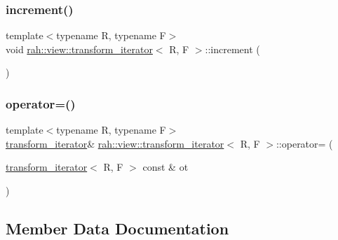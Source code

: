 \subsubsection{\texorpdfstring{increment()}{increment()}}
{\footnotesize\ttfamily template$<$typename R, typename F$>$ \\
void \mbox{\hyperlink{structrah_1_1view_1_1transform__iterator}{rah\+::view\+::transform\+\_\+iterator}}$<$ R, F $>$\+::increment (\begin{DoxyParamCaption}{ }\end{DoxyParamCaption})\hspace{0.3cm}{\ttfamily [inline]}}

\mbox{\label{structrah_1_1view_1_1transform__iterator_a4589b5fff7d8505b8a569c9d1f863929}} 
\subsubsection{\texorpdfstring{operator=()}{operator=()}}
{\footnotesize\ttfamily template$<$typename R, typename F$>$ \\
\mbox{\hyperlink{structrah_1_1view_1_1transform__iterator}{transform\+\_\+iterator}}\& \mbox{\hyperlink{structrah_1_1view_1_1transform__iterator}{rah\+::view\+::transform\+\_\+iterator}}$<$ R, F $>$\+::operator= (\begin{DoxyParamCaption}\item[{\mbox{\hyperlink{structrah_1_1view_1_1transform__iterator}{transform\+\_\+iterator}}$<$ R, F $>$ const \&}]{ot }\end{DoxyParamCaption})\hspace{0.3cm}{\ttfamily [inline]}}



\subsection{Member Data Documentation}
\mbox{\label{structrah_1_1view_1_1transform__iterator_a02ac2e8035d0b7917ee44967069def0d}} 
